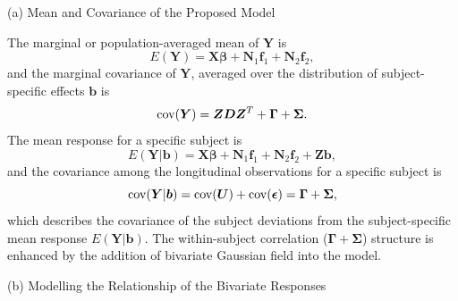 \documentclass[review]{elsarticle}
\begin{document}

(a) Mean and Covariance of the Proposed Model

The marginal  or population-averaged mean of $\bm Y$ is 
$$
E(\bm Y) = \bm X \bm \beta + \bm N_1 \bm f_1 + \bm N_2 \bm f_2,
$$
and the marginal covariance of $\bm Y$, averaged over the distribution of subject-specific effects $\bm b$ is
$$
{\rm cov}(\bm Y) = \bm Z \bm D \bm Z^T + \bm \Gamma + \bm \Sigma.
$$
The mean response for a specific subject is 
$$
E(\bm Y | \bm b) = \bm X \bm \beta + \bm N_1 \bm f_1 + \bm N_2 \bm f_2 + \bm Z \bm b, 
$$
and the covariance among the longitudinal observations for a specific subject is
$$
{\rm cov}(\bm Y | \bm b) = {\rm cov}(\bm U) + {\rm cov}(\bm \epsilon) = \bm \Gamma + \bm \Sigma,
$$
which describes the covariance of the subject deviations from the subject-specific mean response $E(\bm Y | \bm b)$.
The within-subject correlation ($\bm \Gamma + \bm \Sigma$) structure is enhanced by the addition of  bivariate Gaussian field into the model.

(b) Modelling the Relationship of the Bivariate Responses
\end{document}

